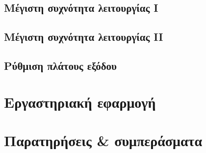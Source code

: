 	\subsection{Μέγιστη συχνότητα λειτουργίας I}
		

	\subsection{Μέγιστη συχνότητα λειτουργίας II}
		

	\subsection{Ρύθμιση πλάτους εξόδου}
		


\newpage
\section{Εργαστηριακή εφαρμογή}
	

\newpage
\section{Παρατηρήσεις \& συμπεράσματα}
	
